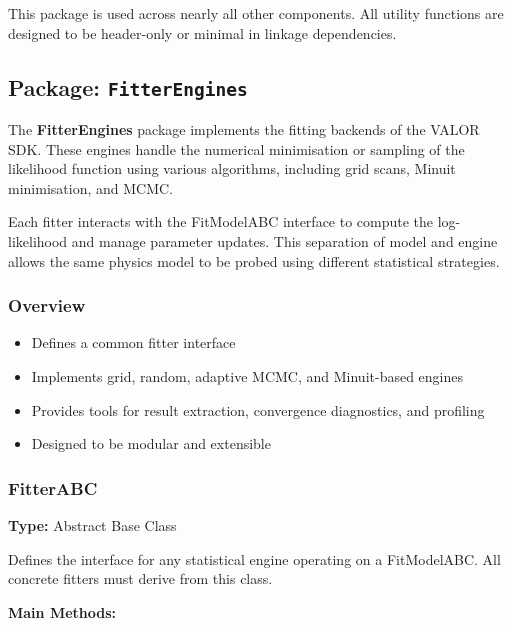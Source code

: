This package is used across nearly all other components.
All utility functions are designed to be header-only or minimal in linkage dependencies.

%
%
%

\subsection{Package: \texttt{FitterEngines}}

The {\color{cadmiumgreen} \textbf{FitterEngines}} package implements the fitting backends of the VALOR SDK.  
These engines handle the numerical minimisation or sampling of the likelihood function using various algorithms, including grid scans, Minuit minimisation, and MCMC.

Each fitter interacts with the {\color{cadmiumgreen} FitModelABC} interface to compute the log-likelihood and manage parameter updates.  
This separation of model and engine allows the same physics model to be probed using different statistical strategies.

\vspace{1em}
\subsubsection*{Overview}

\begin{itemize}
  \item Defines a common fitter interface
  \item Implements grid, random, adaptive MCMC, and Minuit-based engines
  \item Provides tools for result extraction, convergence diagnostics, and profiling
  \item Designed to be modular and extensible
\end{itemize}

\vspace{1em}
\subsubsection*{\color{cadmiumgreen}\bf FitterABC}

\textbf{Type:} Abstract Base Class

Defines the interface for any statistical engine operating on a {\color{cadmiumgreen} FitModelABC}.  
All concrete fitters must derive from this class.

\vspace{0.5em}
\noindent\textbf{Main Methods:}

